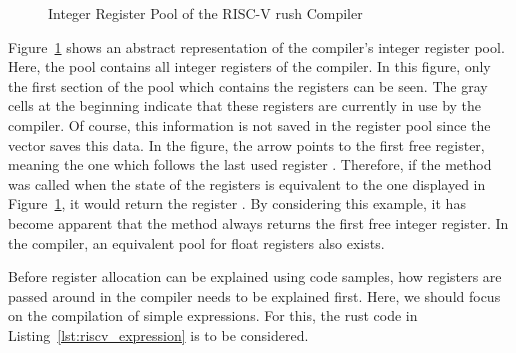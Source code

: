 \begin{figure}
	\centering
	\caption{Integer Register Pool of the RISC-V rush Compiler}\label{fig:riscv_iregister_pool}
\end{figure}

Figure~\ref{fig:riscv_iregister_pool} shows an abstract representation of the compiler's integer register pool.
Here, the pool contains all integer registers of the compiler.
In this figure, only the first section of the pool which contains the  registers can be seen.
The gray cells at the beginning indicate that these registers are currently in use by the compiler.
Of course, this information is not saved in the register pool since the  vector saves this data.
In the figure, the arrow points to the first free register, meaning the one which follows the last used register .
Therefore, if the  method was called when the state of the registers is equivalent to the one displayed in Figure~\ref{fig:riscv_iregister_pool}, it would return the register .
By considering this example, it has become apparent that the method always returns the first free integer register.
In the compiler, an equivalent pool for float registers also exists.

Before register allocation can be explained using code samples, how registers are passed around in the compiler needs to be explained first.
Here, we should focus on the compilation of simple expressions.
For this, the rust code in Listing~\ref{lst:riscv_expression} is to be considered.


